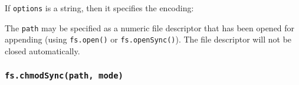 If \texttt{options} is a string, then it specifies the encoding:

\begin{Shaded}
\begin{Highlighting}[]
 \OperatorTok{;}

\NormalTok{(}\OperatorTok{,} \OperatorTok{,} \NormalTok{)}\OperatorTok{;}
\end{Highlighting}
\end{Shaded}

The \texttt{path} may be specified as a numeric file descriptor that has
been opened for appending (using \texttt{fs.open()} or
\texttt{fs.openSync()}). The file descriptor will not be closed
automatically.

\begin{Shaded}
\begin{Highlighting}[]
\OperatorTok{,}\OperatorTok{,} \OperatorTok{;}

\OperatorTok{;}

\NormalTok{ \{}
\OperatorTok{=} \NormalTok{(}\OperatorTok{,} \NormalTok{)}\OperatorTok{;}
  \OperatorTok{,} \OperatorTok{,} \NormalTok{)}\OperatorTok{;}
\NormalTok{\} }
\NormalTok{\} }\NormalTok{ \{}
  \OperatorTok{!==} \NormalTok{)}
    \OperatorTok{;}
\NormalTok{\}}
\end{Highlighting}
\end{Shaded}

\subsubsection{\texorpdfstring{\texttt{fs.chmodSync(path,\ mode)}}{fs.chmodSync(path, mode)}}\label{fs.chmodsyncpath-mode}

